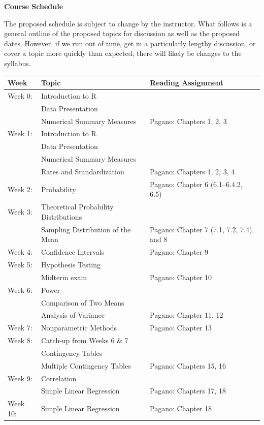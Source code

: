 \documentclass[11pt]{article}
\begin{document}
\vspace{8pt}

\noindent\textbf{Course Schedule}

The proposed schedule is subject to change by the instructor. What follows is a general outline of the proposed topics for discussion as well as the proposed dates. However, if we run out of time, get in a particularly lengthy discussion, or cover a topic more quickly than expected, there will likely be changes to the syllabus.

\vspace{8pt}

\begin{center}
\begin{tabular}{p{1.5cm}p{5.5cm}p{5cm}}
\toprule
\textbf{Week} & \textbf{Topic} & \textbf{Reading Assignment} \\
\midrule
Week 0: & Introduction to R\\
& Data Presentation\\
& Numerical Summary Measures & Pagano: Chapters 1, 2, 3 \\
\midrule
Week 1: & Introduction to R\\
& Data Presentation\\
& Numerical Summary Measures\\
& Rates and Standardization & Pagano: Chapters 1, 2, 3, 4 \\
\midrule
Week 2: & Probability & Pagano: Chapter 6 (6.1--6.4.2, 6.5) \\
\midrule
Week 3: & Theoretical Probability Distributions\\
& Sampling Distribution of the Mean & Pagano: Chapter 7 (7.1, 7.2, 7.4), and 8 \\
\midrule
Week 4: & Confidence Intervals & Pagano: Chapter 9 \\
\midrule
Week 5: & Hypothesis Testing\\
& Midterm exam & Pagano: Chapter 10 \\
\midrule
Week 6: & Power\\
& Comparison of Two Means\\
& Analysis of Variance & Pagano: Chapter 11, 12 \\
\midrule
Week 7: & Nonparametric Methods & Pagano: Chapter 13 \\
\midrule
Week 8: & Catch-up from Weeks 6 \& 7\\
& Contingency Tables\\
& Multiple Contingency Tables & Pagano: Chapters 15, 16 \\
\midrule
Week 9: & Correlation\\
& Simple Linear Regression & Pagano: Chapters 17, 18 \\
\midrule
Week 10: & Simple Linear Regression & Pagano: Chapter 18 \\
\midrule
\end{tabular}
\end{center}
\end{document}
